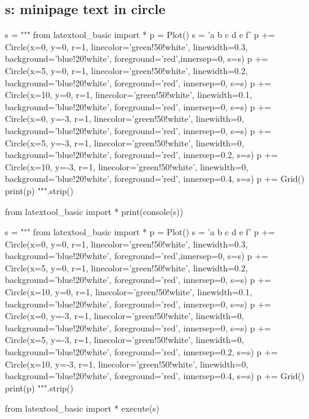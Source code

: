 \newpage
\subsection{s: minipage text in circle}
\begin{python}
s = """
from latextool_basic import *
p = Plot()
s = 'a b c d e f'
p += Circle(x=0, y=0, r=1, linecolor='green!50!white', linewidth=0.3, 
            background='blue!20!white', foreground='red',innersep=0, s=s)
p += Circle(x=5, y=0, r=1, linecolor='green!50!white', linewidth=0.2, 
            background='blue!20!white', foreground='red', innersep=0, s=s)
p += Circle(x=10, y=0, r=1, linecolor='green!50!white', linewidth=0.1, 
            background='blue!20!white', foreground='red', innersep=0, s=s)
p += Circle(x=0, y=-3, r=1, linecolor='green!50!white', linewidth=0, 
            background='blue!20!white', foreground='red', innersep=0, s=s)
p += Circle(x=5, y=-3, r=1, linecolor='green!50!white', linewidth=0, 
            background='blue!20!white', foreground='red', 
            innersep=0.2, s=s)
p += Circle(x=10, y=-3, r=1, linecolor='green!50!white', linewidth=0, 
            background='blue!20!white', foreground='red',
            innersep=0.4, s=s)
p += Grid()
print(p)
""".strip()

from latextool_basic import *
print(console(s))
\end{python}
\begin{python}
s = """
from latextool_basic import *
p = Plot()
s = 'a b c d e f'
p += Circle(x=0, y=0, r=1, linecolor='green!50!white', linewidth=0.3, 
            background='blue!20!white', foreground='red',innersep=0, s=s)
p += Circle(x=5, y=0, r=1, linecolor='green!50!white', linewidth=0.2, 
            background='blue!20!white', foreground='red', innersep=0, s=s)
p += Circle(x=10, y=0, r=1, linecolor='green!50!white', linewidth=0.1, 
            background='blue!20!white', foreground='red', innersep=0, s=s)
p += Circle(x=0, y=-3, r=1, linecolor='green!50!white', linewidth=0, 
            background='blue!20!white', foreground='red', innersep=0, s=s)
p += Circle(x=5, y=-3, r=1, linecolor='green!50!white', linewidth=0, 
            background='blue!20!white', foreground='red', 
            innersep=0.2, s=s)
p += Circle(x=10, y=-3, r=1, linecolor='green!50!white', linewidth=0, 
            background='blue!20!white', foreground='red',
            innersep=0.4, s=s)
p += Grid()
print(p)
""".strip()

from latextool_basic import *
execute(s)
\end{python}




